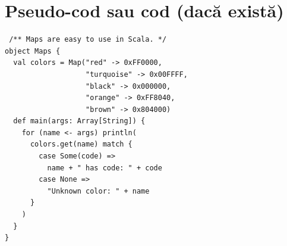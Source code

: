 \appendix

\chapter{Pseudo-cod sau cod (dacă există)}



\begin{lstlisting}
 /** Maps are easy to use in Scala. */
object Maps {
  val colors = Map("red" -> 0xFF0000,
                   "turquoise" -> 0x00FFFF,
                   "black" -> 0x000000,
                   "orange" -> 0xFF8040,
                   "brown" -> 0x804000)
  def main(args: Array[String]) {
    for (name <- args) println(
      colors.get(name) match {
        case Some(code) =>
          name + " has code: " + code
        case None =>
          "Unknown color: " + name
      }
    )
  }
}
\end{lstlisting}


